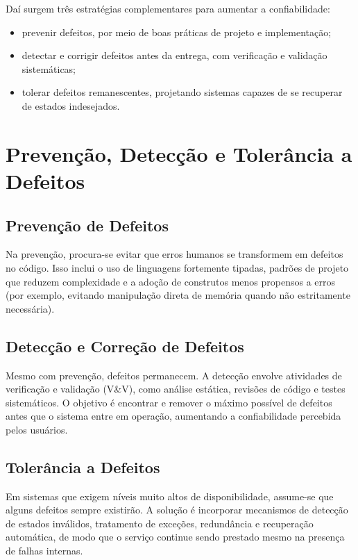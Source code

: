 \documentclass[12pt,a4paper,twoside]{report}
\begin{document}
Daí surgem três estratégias complementares para aumentar a confiabilidade:
\begin{itemize}[nosep]
    \item prevenir defeitos, por meio de boas práticas de projeto e
    implementação;
    \item detectar e corrigir defeitos antes da entrega, com verificação e
    validação sistemáticas;
    \item tolerar defeitos remanescentes, projetando sistemas capazes de
    se recuperar de estados indesejados.
\end{itemize}

\section{Prevenção, Detecção e Tolerância a Defeitos}

\subsection{Prevenção de Defeitos}

Na prevenção, procura-se evitar que erros humanos se transformem em defeitos
no código. Isso inclui o uso de linguagens fortemente tipadas, padrões de
projeto que reduzem complexidade e a adoção de construtos menos propensos a
erros (por exemplo, evitando manipulação direta de memória quando não
estritamente necessária).

\subsection{Detecção e Correção de Defeitos}

Mesmo com prevenção, defeitos permanecem. A detecção envolve atividades de
verificação e validação (V\&V), como análise estática, revisões de código e
testes sistemáticos. O objetivo é encontrar e remover o máximo possível de
defeitos antes que o sistema entre em operação, aumentando a
confiabilidade percebida pelos usuários.

\subsection{Tolerância a Defeitos}

Em sistemas que exigem níveis muito altos de disponibilidade, assume-se que
alguns defeitos sempre existirão. A solução é incorporar mecanismos de
detecção de estados inválidos, tratamento de exceções, redundância e
recuperação automática, de modo que o serviço continue sendo prestado mesmo
na presença de falhas internas.
\end{document}

